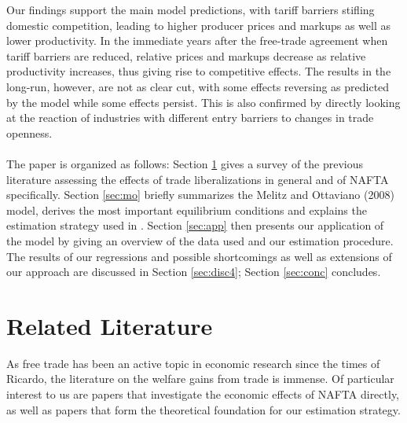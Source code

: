 Our findings support the main model predictions, with tariff barriers stifling domestic competition, leading to higher producer prices and markups as well as lower productivity. In the immediate years after the free-trade agreement when tariff barriers are reduced, relative prices and markups decrease as relative productivity increases, thus giving rise to competitive effects. The results in the long-run, however, are not as clear cut, with some effects reversing as predicted by the model while some effects persist. This is also confirmed by directly looking at the reaction of industries with different entry barriers to changes in trade openness. \\
\vspace{0.5cm} \\
The paper is organized as follows: Section \ref{sec:lit} gives a survey of the previous literature assessing the effects of trade liberalizations in general and of NAFTA specifically. Section \ref{sec:mo} briefly summarizes the Melitz and Ottaviano (2008) model, derives the most important equilibrium conditions and explains the estimation strategy used in \citet{Chen2009}. Section \ref{sec:app} then presents our application of the model by giving an overview of the data used and our estimation procedure. The results of our regressions and possible shortcomings as well as extensions of our approach are discussed in Section \ref{sec:disc4}; Section \ref{sec:conc} concludes.

\newpage


\section{Related Literature}\label{sec:lit}

As free trade has been an active topic in economic research since the times of Ricardo, the literature on the welfare gains from trade is immense. Of particular interest to us are papers that investigate the economic effects of NAFTA directly, as well as papers that form the theoretical foundation for our estimation strategy.

